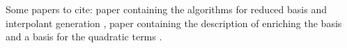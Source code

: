 Some papers to cite: paper containing the algorithms for reduced basis and interpolant generation
\citep{Field_2014}, paper containing the description of enriching the basis and a basis for the quadratic terms
\cite{2016arXiv160408253S}.
